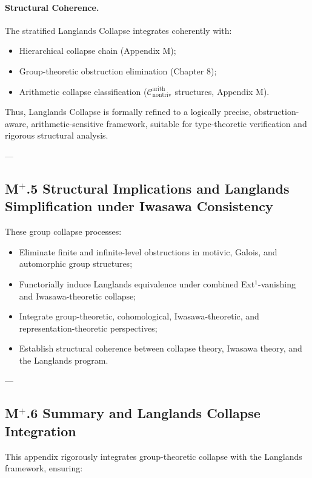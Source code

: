 \documentclass[11pt]{article}
\begin{document}
\paragraph{Structural Coherence.}

The stratified Langlands Collapse integrates coherently with:

\begin{itemize}
    \item Hierarchical collapse chain (Appendix M);
    \item Group-theoretic obstruction elimination (Chapter 8);
    \item Arithmetic collapse classification (\( \mathcal{C}_{\mathrm{nontriv}}^{\mathrm{arith}} \) structures, Appendix M).
\end{itemize}

Thus, Langlands Collapse is formally refined to a logically precise, obstruction-aware, arithmetic-sensitive framework, suitable for type-theoretic verification and rigorous structural analysis.


---

\subsection*{M$^{+}$.5 Structural Implications and Langlands Simplification under Iwasawa Consistency}

These group collapse processes:

\begin{itemize}
    \item Eliminate finite and infinite-level obstructions in motivic, Galois, and automorphic group structures;
    \item Functorially induce Langlands equivalence under combined Ext$^1$-vanishing and Iwasawa-theoretic collapse;
    \item Integrate group-theoretic, cohomological, Iwasawa-theoretic, and representation-theoretic perspectives;
    \item Establish structural coherence between collapse theory, Iwasawa theory, and the Langlands program.
\end{itemize}

---

\subsection*{M$^{+}$.6 Summary and Langlands Collapse Integration}

This appendix rigorously integrates group-theoretic collapse with the Langlands framework, ensuring:
\end{document}
